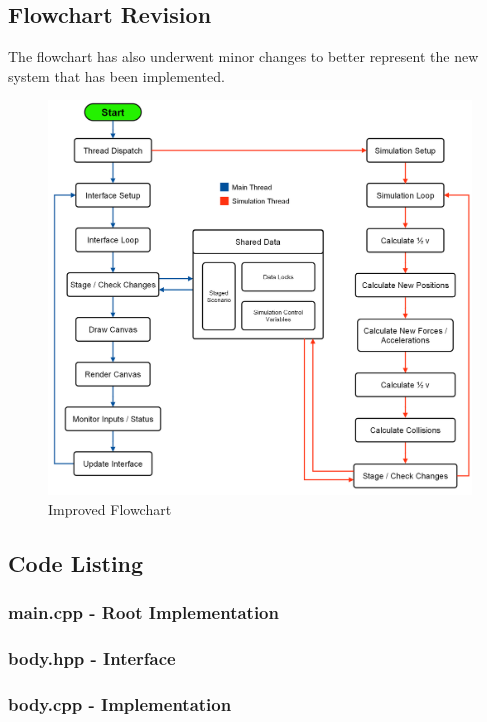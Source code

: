 {\pagebreak
\subsection{Flowchart Revision}
The flowchart has also underwent minor changes to better represent the new system that has been implemented.

\begin{figure}[!ht]
  \centering
  \includegraphics[scale=1]{../img/flowchartNew.png} 
  \caption{Improved Flowchart}
\end{figure}

\pagebreak
\subsection{Code Listing}
\subsubsection{main.cpp - Root Implementation}
\texttt{} 
\pagebreak
\subsubsection{body.hpp - Interface}
\texttt{} 
\pagebreak
\subsubsection{body.cpp - Implementation}
\texttt{} 
\pagebreak
}
